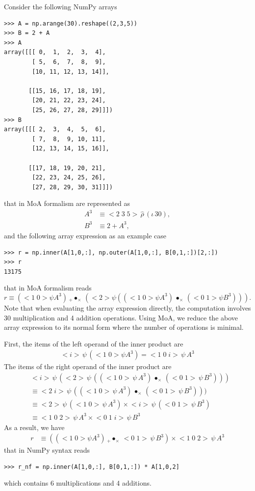 \documentclass[a4paper,12pt]{article}
\newcommand{\reshape}{\,\widehat{\rho}\,}         %
\newcommand{\range}{\iota\,}                      %
\newcommand{\vc}[1]{<#1>}                         %
\newcommand{\vcc}[2]{<#1\;#2>}                    %
\newcommand{\vccc}[3]{<#1\;#2\;#3>}               %
\newcommand{\outerprod}[1]{\,\bullet_{#1}\,}              %
\newcommand{\innerprod}[2]{\,{}_{#1}\!\!\bullet_{#2}\,}   %
\newcommand{\getitem}[2]{{#2}\,\psi\,{#1}}        %
\begin{document}
Consider the following NumPy arrays
\begin{verbatim}
>>> A = np.arange(30).reshape((2,3,5))
>>> B = 2 + A
>>> A
array([[[ 0,  1,  2,  3,  4],
        [ 5,  6,  7,  8,  9],
        [10, 11, 12, 13, 14]],

       [[15, 16, 17, 18, 19],
        [20, 21, 22, 23, 24],
        [25, 26, 27, 28, 29]]])
>>> B
array([[[ 2,  3,  4,  5,  6],
        [ 7,  8,  9, 10, 11],
        [12, 13, 14, 15, 16]],

       [[17, 18, 19, 20, 21],
        [22, 23, 24, 25, 26],
        [27, 28, 29, 30, 31]]])
\end{verbatim}
that in MoA formalism are represented as
\begin{align}
  A^3 &\equiv \vccc235\reshape(\range30), \\
  B^3 &\equiv 2+A^3,
\end{align}
and the following array expression as an example case
\begin{verbatim}
>>> r = np.inner(A[1,0,:], np.outer(A[1,0,:], B[0,1,:])[2,:])
>>> r
13175
\end{verbatim}
that in MoA formalism reads
\begin{equation}
r \equiv (\vcc10\psi A^3) \innerprod+\times (\vc2\psi((\vcc10\psi A^3) \outerprod\times (\vcc01\psi B^3))).
\end{equation}
Note that when evaluating the array expression directly, the
computation involves 30 multiplication and 4 addition
operations. Using MoA, we reduce the above array expression to its
normal form where the number of operations is minimal.

First, the items of the left operand of the inner product are
\begin{align*}
  \getitem{(\vcc10\psi A^3)}{\vc i} = \getitem{A^3}{\vccc10i}
\end{align*}
The items of the right operand of the inner product are
\begin{align}
&\getitem{
  (\getitem{((\getitem{A^3}{\vcc10}) \outerprod\times (\getitem{B^3}{\vcc01}))}{\vc2})
}{\vc i} \\
&\equiv \getitem{((\getitem{A^3}{\vcc10}) \outerprod\times (\getitem{B^3}{\vcc01})))}{\vcc2i} \\
&\equiv \getitem{(\getitem{A^3}{\vcc10})}{\vc2} \times \getitem{(\getitem{B^3}{\vcc01})}{\vc i}\\
&\equiv \getitem{A^3}{\vccc102} \times \getitem{B^3}{\vccc01i}
\end{align}
As a result, we have
\begin{align*}
  r &\equiv ((\vcc10\psi A^3) \innerprod+\times  \getitem{B^3}{\vcc01})\times\getitem{A^3}{\vccc102}
\end{align*}
that in NumPy syntax reads
\begin{verbatim}
>>> r_nf = np.inner(A[1,0,:], B[0,1,:]) * A[1,0,2]
\end{verbatim}
which contains 6 multiplications and 4 additions.
\end{document}
